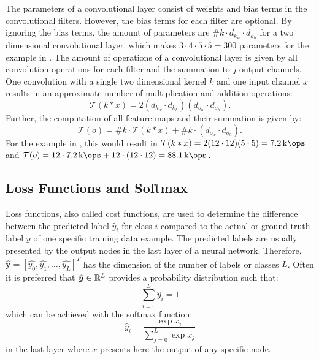 The parameters of a convolutional layer consist of weights and bias terms in the convolutional filters.
However, the bias terms for each filter are optional.
By ignoring the bias terms, the amount of parameters are $\#k \cdot d_{k_w} \cdot d_{k_h}$ for a two dimensional convolutional layer, which makes $3 \cdot 4 \cdot 5 \cdot 5 = 300$ parameters for the example in .
The amount of operations of a convolutional layer is given by all convolution operations for each filter and the summation to $j$ output channels.
One convolution with a single two dimensional kernel $k$ and one input channel $x$ results in an approximate number of multiplication and addition operations:
\begin{equation}
  \mathcal{T}(k * x) = 2(d_{k_w} \cdot d_{k_h}) (d_{o_w} \cdot d_{o_h}).
\end{equation}
Further, the computation of all feature maps and their summation is given by:
\begin{equation}
  \mathcal{T}(o) = \#k \cdot \mathcal{T}(k * x) + \#k \cdot (d_{o_w} \cdot d_{o_h}).
\end{equation}
For the example in , this would result in $\mathcal{T}(k * x) = 2 (12 \cdot 12) (5 \cdot 5) = \SI{7.2}{\kilo\ops}$ and $\mathcal{T}(o) = 12 \cdot \SI{7.2}{\kilo\ops} + 12 \cdot (12 \cdot 12) = \SI{88.1}{\kilo\ops}$.



\subsection{Loss Functions and Softmax}
Loss functions, also called cost functions, are used to determine the difference between the predicted label $\hat{y}_i$ for class $i$ compared to the actual or ground truth label $y$ of one specific training data example.
The predicted labels are usually presented by the output nodes in the last layer of a neural network.
Therefore, $\hat{\bm{y}} = [\hat{y_0}, \hat{y_1}, \dots, \hat{y_L}]^T$ has the dimension of the number of labels or classes $L$.
Often it is preferred that $\hat{\bm{y}} \in \mathbb{R}^L$ provides a probability distribution such that:
\begin{equation}
  \sum_{i=0}^L \hat{y}_i = 1
\end{equation}
which can be achieved with the softmax function:
\begin{equation}\label{eq:nn_theory_softmax}
  \hat{y}_i = \frac{\exp{x_i}}{\sum_{j=0}^{L}\exp{x_j}}
\end{equation}
in the last layer where $x$ presents here the output of any specific node.

